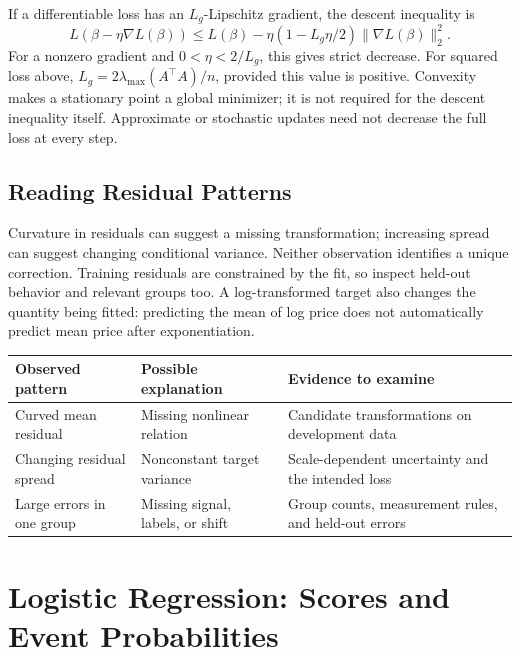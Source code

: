 If a differentiable loss has an $L_g$-Lipschitz gradient, the descent inequality is
\[
L(\beta-\eta\nabla L(\beta))
\leq L(\beta)-\eta(1-L_g\eta/2)\|\nabla L(\beta)\|_2^2.
\]
For a nonzero gradient and $0<\eta<2/L_g$, this gives strict decrease. For squared loss above, $L_g=2\lambda_{\max}(A^\top A)/n$, provided this value is positive. Convexity makes a stationary point a global minimizer; it is not required for the descent inequality itself. Approximate or stochastic updates need not decrease the full loss at every step.

\subsection{Reading Residual Patterns}

Curvature in residuals can suggest a missing transformation; increasing spread can suggest changing conditional variance. Neither observation identifies a unique correction. Training residuals are constrained by the fit, so inspect held-out behavior and relevant groups too. A log-transformed target also changes the quantity being fitted: predicting the mean of log price does not automatically predict mean price after exponentiation.

\par\addvspace{\intextsep}\noindent\begin{minipage}{\linewidth}
\centering\small
\begin{tabular}{@{}L{3.0cm}L{3.05cm}L{4.05cm}@{}}
\toprule
Observed pattern & Possible explanation & Evidence to examine \\
\midrule
Curved mean residual & Missing nonlinear relation & Candidate transformations on development data \\
Changing residual spread & Nonconstant target variance & Scale-dependent uncertainty and the intended loss \\
Large errors in one group & Missing signal, labels, or shift & Group counts, measurement rules, and held-out errors \\
\bottomrule
\end{tabular}
\label{tab:residual-diagnostic-next-move}
\end{minipage}\par\addvspace{\intextsep}

\section{Logistic Regression: Scores and Event Probabilities}

